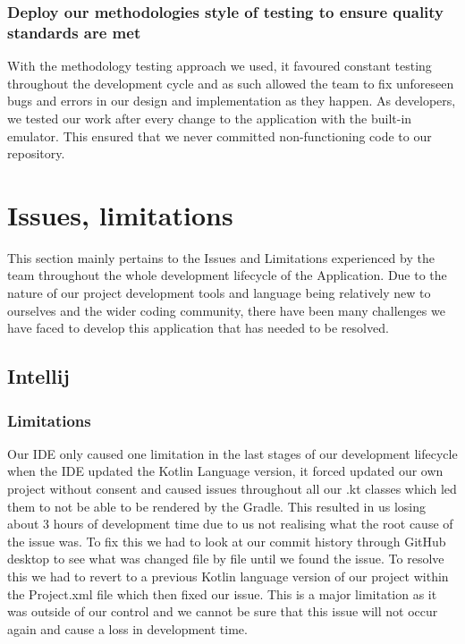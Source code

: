 \subsubsection {Deploy our methodologies style of testing to ensure quality standards are met}
With the methodology testing approach we used, it favoured constant testing throughout the development cycle and as such allowed the team to fix unforeseen bugs and errors in our design and implementation as they happen. As developers, we tested our work after every change to the application with the built-in emulator. This ensured that we never committed non-functioning code to our repository.
\newpage
\section{Issues, limitations}
This section mainly pertains to the Issues and Limitations experienced by the team throughout the whole development lifecycle of the Application. Due to the nature of our project development tools and language being relatively new to ourselves and the wider coding community, there have been many challenges we have faced to develop this application that has needed to be resolved.
\subsection{Intellij}
\subsubsection{Limitations}
Our IDE only caused one limitation in the last stages of our development lifecycle when the IDE updated the Kotlin Language version, it forced updated our own project without consent and caused issues throughout all our .kt classes which led them to not be able to be rendered by the Gradle.
\newline
\newline
This resulted in us losing about 3 hours of development time due to us not realising what the root cause of the issue was. To fix this we had to look at our commit history through GitHub desktop to see what was changed file by file until we found the issue.
\newline
\newline
To resolve this we had to revert to a previous Kotlin language version of our project within the Project.xml file which then fixed our issue. This is a major limitation as it was outside of our control and we cannot be sure that this issue will not occur again and cause a loss in development time.

